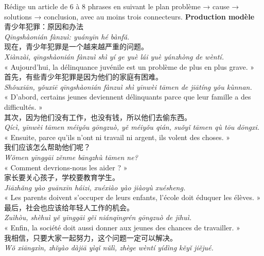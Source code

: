 \documentclass[11pt]{article}
\begin{document}
\begin{exoresolu}
Rédige un article de 6 à 8 phrases en suivant le plan problème → cause → solutions → conclusion, avec au moins trois connecteurs.
\tcblower
\textbf{Production modèle} \\[0.3em]
青少年犯罪：原因和办法 \\
\emph{Qīngshàonián fànzuì: yuányīn hé bànfǎ.} \\[0.4em]
现在，青少年犯罪是一个越来越严重的问题。\\
\emph{Xiànzài, qīngshàonián fànzuì shì yí ge yuè lái yuè yánzhòng de wèntí.} \\
« Aujourd'hui, la délinquance juvénile est un problème de plus en plus grave. » \\[0.4em]
首先，有些青少年犯罪是因为他们的家庭有困难。\\
\emph{Shǒuxiān, yǒuxiē qīngshàonián fànzuì shì yīnwèi tāmen de jiātíng yǒu kùnnan.} \\
« D'abord, certains jeunes deviennent délinquants parce que leur famille a des difficultés. » \\[0.4em]
其次，因为他们没有工作，也没有钱，所以他们去偷东西。\\
\emph{Qícì, yīnwèi tāmen méiyǒu gōngzuò, yě méiyǒu qián, suǒyǐ tāmen qù tōu dōngxi.} \\
« Ensuite, parce qu'ils n'ont ni travail ni argent, ils volent des choses. » \\[0.4em]
我们应该怎么帮助他们呢？\\
\emph{Wǒmen yīnggāi zěnme bāngzhù tāmen ne?} \\
« Comment devrions-nous les aider ? » \\[0.4em]
家长要关心孩子，学校要教育学生。\\
\emph{Jiāzhǎng yào guānxīn háizi, xuéxiào yào jiàoyù xuésheng.} \\
« Les parents doivent s'occuper de leurs enfants, l'école doit éduquer les élèves. » \\[0.4em]
最后，社会也应该给年轻人工作的机会。\\
\emph{Zuìhòu, shèhuì yě yīnggāi gěi niánqīngrén gōngzuò de jīhuì.} \\
« Enfin, la société doit aussi donner aux jeunes des chances de travailler. » \\[0.4em]
我相信，只要大家一起努力，这个问题一定可以解决。\\
\emph{Wǒ xiāngxìn, zhǐyào dàjiā yìqǐ nǔlì, zhège wèntí yídìng kěyǐ jiějué.} \\

\end{exoresolu}
\end{document}
